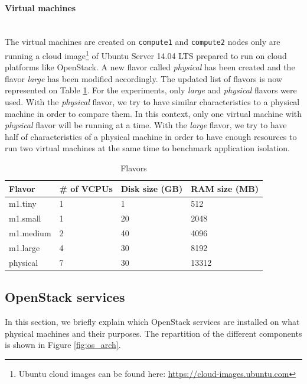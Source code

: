 \paragraph{Virtual machines}\mbox{}\\
The virtual machines are created on \texttt{compute1} and \texttt{compute2} nodes only are running a cloud image\footnote{Ubuntu cloud images can be found here: \url{https://cloud-images.ubuntu.com}} of Ubuntu Server 14.04 LTS prepared to run on cloud platforms like OpenStack. 
A new flavor called \textit{physical} has been created and the flavor \textit{large} has been modified accordingly.
The updated list of flavors is now represented on Table \ref{table:flavors_list_2}. 
For the experiments, only \textit{large} and \textit{physical} flavors were used. 
With the \textit{physical} flavor, we try to have similar characteristics to a physical machine in order to compare them. 
In this context, only one virtual machine with \textit{physical} flavor will be running at a time. 
With the \textit{large} flavor, we try to have half of characteristics of a physical machine in order to have enough resources to run two virtual machines at the same time to benchmark application isolation.

\begin{table}[h]
	\centering
	\begin{tabular}{|l|l|l|l|}
		\hline
		\textbf{Flavor} & \textbf{\# of VCPUs} & \textbf{Disk size (GB)} & \textbf{RAM size (MB)}\\
		\hline
		m1.tiny & 1 & 1 & 512 \\
		m1.small & 1 & 20 & 2048 \\
		m1.medium & 2 & 40 & 4096 \\
		m1.large & 4 & 30 & 8192 \\
		physical & 7 & 30 & 13312 \\
		\hline
	\end{tabular}
	\caption{Flavors}
	\label{table:flavors_list_2}
\end{table}



\subsection{OpenStack services} %
In this section, we briefly explain which OpenStack services are installed on what physical machines and their purposes.
The repartition of the different components is shown in Figure \ref{fig:os_arch}.

